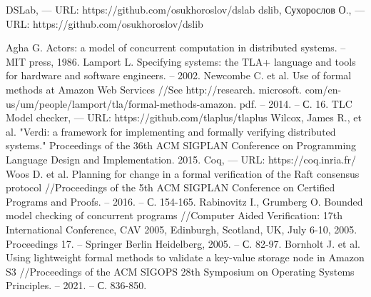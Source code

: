 \documentclass[a4paper,12pt]{extarticle}
\begin{document}
\begin{thebibliography}{00}
 DSLab, --- URL: https://github.com/osukhoroslov/dslab
 dslib, Сухорослов О., --- URL: https://github.com/osukhoroslov/dslib

 Agha G. Actors: a model of concurrent computation in distributed systems. – MIT press, 1986.
 Lamport L. Specifying systems: the TLA+ language and tools for hardware and software engineers. – 2002.
 Newcombe C. et al. Use of formal methods at Amazon Web Services //See http://research. microsoft. com/en-us/um/people/lamport/tla/formal-methods-amazon. pdf. – 2014. – С. 16.
 TLC Model checker, --- URL: https://github.com/tlaplus/tlaplus
 Wilcox, James R., et al. "Verdi: a framework for implementing and formally verifying distributed systems." Proceedings of the 36th ACM SIGPLAN Conference on Programming Language Design and Implementation. 2015.
 Coq, --- URL: https://coq.inria.fr/
 Woos D. et al. Planning for change in a formal verification of the Raft consensus protocol //Proceedings of the 5th ACM SIGPLAN Conference on Certified Programs and Proofs. – 2016. – С. 154-165.
 Rabinovitz I., Grumberg O. Bounded model checking of concurrent programs //Computer Aided Verification: 17th International Conference, CAV 2005, Edinburgh, Scotland, UK, July 6-10, 2005. Proceedings 17. – Springer Berlin Heidelberg, 2005. – С. 82-97.
 Bornholt J. et al. Using lightweight formal methods to validate a key-value storage node in Amazon S3 //Proceedings of the ACM SIGOPS 28th Symposium on Operating Systems Principles. – 2021. – С. 836-850.


\end{thebibliography}
\end{document}

